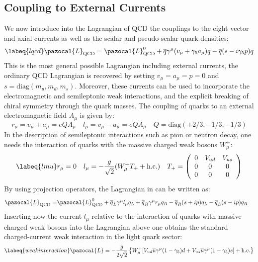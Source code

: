 \documentclass[../main.tex]{subfiles}
\begin{document}
\subsection{Coupling to External Currents}
We now introduce into the Lagrangian of QCD the couplings to the eight vector and axial currents as well as the scalar and pseudo-scalar quark densities:
\begin{equation}
\labeq{lqcd}
\pazocal{L}_{\text{QCD}}=\pazocal{L}_{\text{QCD}}^0+\overline{q}\gamma^\mu(v_\mu+\gamma_5a_\mu)q-\overline{q}(s-i\gamma_5p)q
\end{equation}
This is the most general possible Lagrangian including external currents, the ordinary QCD Lagrangian is recovered by setting $v_\mu=a_\mu=p=0$ and $s=\text{diag}(m_u,m_d,m_s)$. Moreover, these currents can be used to incorporate the electromagnetic and semileptonic weak interactions, and the explicit breaking of chiral symmetry through the quark masses. The coupling of quarks to an external electromagnetic field $A_\mu$ is given by:
\[
r_\mu=v_\mu+a_\mu=eQA_\mu \quad l_\mu=v_\mu-a_\mu=eQA_\mu \quad Q=\text{diag}(+2/3,-1/3,-1/3)
\]
In the description of semileptonic interactions such as pion or neutron decay, one needs the interaction of quarks with the massive charged weak bosons $W_\mu^\pm$:
\begin{equation}
\labeq{lmu}
r_\mu=0 \quad l_\mu=-\frac{g}{\sqrt{2}}(W_\mu^+T_++\text{h.c.}) \quad T_+=\left(\begin{array}{ccc}
    0 & V_{ud} & V_{us} \\
    0 & 0 & 0 \\
    0 & 0 & 0
\end{array}\right)
\end{equation}
By using projection operators, the Lagrangian in  can be written as:
\[
\begin{aligned}
\pazocal{L}_{\text{QCD}}=&\pazocal{L}_{\text{QCD}}^0+\overline{q}_L\gamma^\mu l_\mu q_L+\overline{q}_R\gamma^\mu r_\mu q_R-\overline{q}_R(s+ip)q_L-\overline{q}_L(s-ip)q_R
\end{aligned}
\]
Inserting now the current $l_\mu$ relative to the interaction of quarks with massive charged weak bosons into the Lagrangian above one obtains the standard
charged-current weak interaction in the light quark sector:
\begin{equation}
\labeq{weakinteraction}
\pazocal{L}=-\frac{g}{2\sqrt{2}}\left\{W_\mu^+[V_{ud}\overline{u}\gamma^\mu(1-\gamma_5)d+V_{us}\overline{u}\gamma^\mu(1-\gamma_5)s]+\text{h.c.}\right\}
\end{equation}
\end{document}
